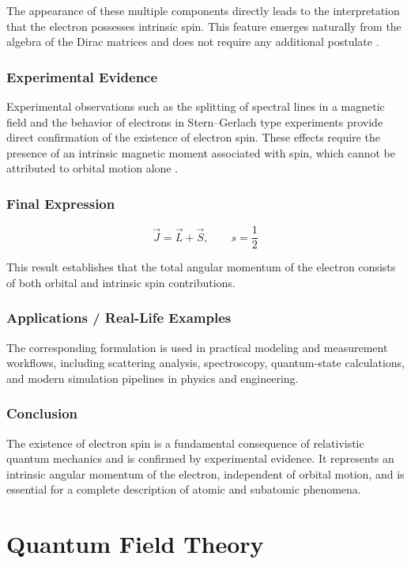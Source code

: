 \documentclass[12pt]{report}
\begin{document}
The appearance of these multiple components directly leads to the interpretation that the electron possesses intrinsic spin. This feature emerges naturally from the algebra of the Dirac matrices and does not require any additional postulate .

\subsection*{Experimental Evidence}

Experimental observations such as the splitting of spectral lines in a magnetic field and the behavior of electrons in Stern--Gerlach type experiments provide direct confirmation of the existence of electron spin. These effects require the presence of an intrinsic magnetic moment associated with spin, which cannot be attributed to orbital motion alone .

\subsection*{Final Expression}

\begin{equation*}
\boxed{\vec{J} = \vec{L} + \vec{S}, \qquad s = \frac{1}{2}}
\end{equation*}

This result establishes that the total angular momentum of the electron consists of both orbital and intrinsic spin contributions.

\subsection*{Applications / Real-Life Examples}
The corresponding formulation is used in practical modeling and measurement workflows, including scattering analysis, spectroscopy, quantum-state calculations, and modern simulation pipelines in physics and engineering.

\subsection*{Conclusion}

The existence of electron spin is a fundamental consequence of relativistic quantum mechanics and is confirmed by experimental evidence. It represents an intrinsic angular momentum of the electron, independent of orbital motion, and is essential for a complete description of atomic and subatomic phenomena.


\chapter{Quantum Field Theory}
\end{document}
